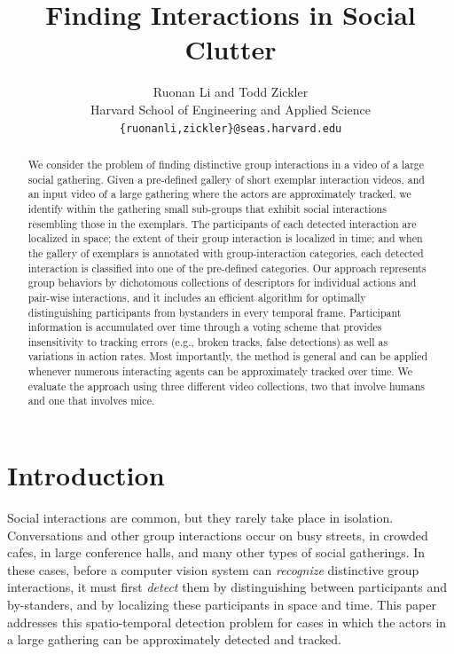 \documentclass[10pt,twocolumn,letterpaper]{article}
\begin{document}
\title{Finding Interactions in Social Clutter}
\author{ Ruonan Li and Todd Zickler\\
Harvard School of Engineering and Applied Science\\
{\tt\small \{ruonanli,zickler\}@seas.harvard.edu}
}

\maketitle

\begin{abstract}
We consider the problem of finding distinctive group interactions in a video of a large social gathering. Given a pre-defined gallery of short exemplar interaction videos, and an input video of a large gathering where the actors are approximately tracked, we identify within the gathering small sub-groups that exhibit social interactions resembling those in the exemplars. The participants of each detected interaction are localized in space; the extent of their group interaction is localized in time; and when the gallery of exemplars is annotated with group-interaction categories, each detected interaction is  classified into one of the pre-defined categories. Our approach represents group behaviors by dichotomous collections of descriptors for individual actions and pair-wise interactions, and it includes an efficient algorithm for optimally distinguishing participants from bystanders in every temporal frame. Participant information is accumulated over time through a voting scheme that provides insensitivity to tracking errors (e.g., broken tracks, false detections) as well as variations in action rates. Most importantly, the method is general and can be applied whenever numerous interacting agents can be approximately tracked over time. We evaluate the approach using three different video collections, two that involve humans and one that involves mice.
\end{abstract}

\section{Introduction}

Social interactions are common, but they rarely take place in isolation. Conversations and other group interactions occur on busy streets, in crowded cafes, in large conference halls, and many other types of social gatherings. In these cases, before a computer vision system can \emph{recognize} distinctive group interactions, it must first \emph{detect} them by distinguishing between participants and by-standers, and by localizing these participants in space and time. This paper addresses this spatio-temporal detection problem for cases in which the actors in a large gathering can be approximately detected and tracked.
\end{document}
